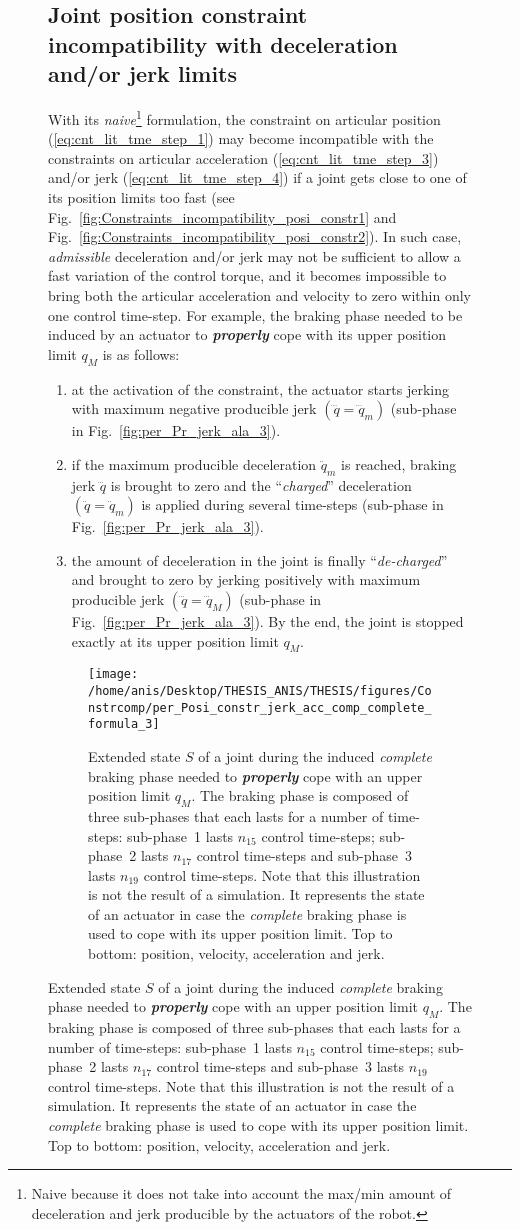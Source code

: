 \begin{figure}[!htbp]
\subsection{Joint position constraint incompatibility with deceleration and/or jerk limits}
\label{subsec:complete_b_ph}
With its \textit{naive}\footnote{Naive because it does not take into account the max/min amount of deceleration and jerk producible by the actuators of the robot.} formulation, the constraint on articular position (\ref{eq:cnt_lit_tme_step_1}) may become incompatible with the constraints on articular acceleration (\ref{eq:cnt_lit_tme_step_3}) and/or jerk (\ref{eq:cnt_lit_tme_step_4}) if a joint gets close to one of its position limits too fast (see Fig.~\ref{fig:Constraints_incompatibility_posi_constr1} and Fig.~\ref{fig:Constraints_incompatibility_posi_constr2}). In such case, \textit{admissible} deceleration and/or jerk may not be sufficient to allow a fast variation of the control torque, and it becomes impossible to bring both the articular acceleration and velocity to zero within only one control time-step. For example, the  braking phase needed to be induced by an actuator to \textit{\textbf{properly}} cope with its upper position limit $q_M$ is as follows: 
\begin{enumerate}
\item at the activation of the constraint, the actuator starts jerking with maximum negative producible jerk $(\dddot{q} = \dddot{q}_m)$ (sub-phase  in Fig.~\ref{fig:per_Pr_jerk_ala_3}). 
\item if the maximum producible deceleration $\ddot{q}_m$ is reached, braking jerk $\dddot{q}$ is brought to zero and the ``\textit{charged}'' deceleration $(\ddot{q} = \ddot{q}_m)$ is applied during several time-steps (sub-phase  in Fig.~\ref{fig:per_Pr_jerk_ala_3}). 
\item the amount of deceleration in the joint is finally ``\textit{de-charged}'' and brought to zero by jerking positively with maximum producible jerk $(\dddot{q} = \dddot{q}_M)$ (sub-phase  in Fig.~\ref{fig:per_Pr_jerk_ala_3}). By the end, the joint is stopped exactly at its upper position limit $q_M$. 
\end{enumerate}
\begin{figure}[!htbp]
{\texttt{[image: /home/anis/Desktop/THESIS\_ANIS/THESIS/figures/Constrcomp/per\_Posi\_constr\_jerk\_acc\_comp\_complete\_formula\_3]}}
\caption{Extended state $S$ of a joint during the induced \textit{complete} braking phase needed to \textit{\textbf{properly}} cope with an upper position limit $q_{M}$. The braking phase is composed of three sub-phases that each lasts for a number of time-steps: sub-phase~1 lasts $n_{15}$ control time-steps; sub-phase~2 lasts $n_{17}$ control time-steps and sub-phase~3 lasts $n_{19}$ control time-steps. Note that this illustration is not the result of a simulation. It represents the state of an actuator in case the \textit{complete} braking phase is used to cope with its upper position limit. Top to bottom: position, velocity, acceleration and jerk.} 

\end{figure}
\end{figure}
